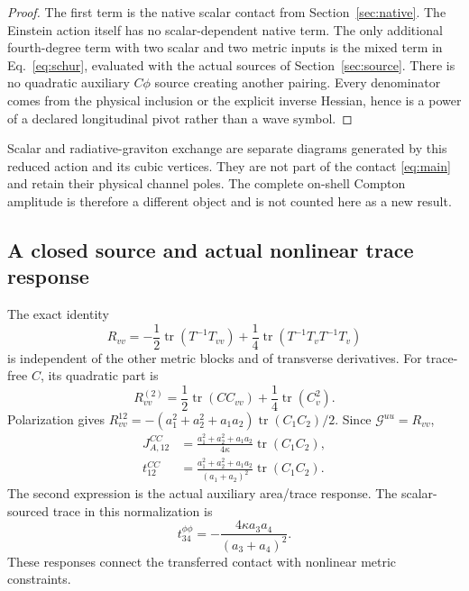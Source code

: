 \documentclass[11pt]{article}
\newcommand{\tr}{\operatorname{tr}}
\newcommand{\Gden}{\mathcal G}
\begin{document}
\begin{proof}
The first term is the native scalar contact from Section~\ref{sec:native}.
The Einstein action itself has no scalar-dependent native term.
The only additional fourth-degree term with two scalar and two metric inputs is the mixed term in Eq.~\eqref{eq:schur}, evaluated with the actual sources of Section~\ref{sec:source}.
There is no quadratic auxiliary \(C\phi\) source creating another pairing.
Every denominator comes from the physical inclusion or the explicit inverse Hessian, hence is a power of a declared longitudinal pivot rather than a wave symbol.
\end{proof}

Scalar and radiative-graviton exchange are separate diagrams generated by this reduced action and its cubic vertices.
They are not part of the contact \eqref{eq:main} and retain their physical channel poles.
The complete on-shell Compton amplitude is therefore a different object and is not counted here as a new result.

\subsection{A closed source and actual nonlinear trace response}

The exact identity
\begin{equation}
 R_{vv}=-\frac12\tr(T^{-1}T_{vv})
 +\frac14\tr(T^{-1}T_vT^{-1}T_v)
 \label{eq:Rvv}
\end{equation}
is independent of the other metric blocks and of transverse derivatives.
For trace-free \(C\), its quadratic part is
\begin{equation}
 R_{vv}^{(2)}=\frac12\tr(CC_{vv})+\frac14\tr(C_v^2).
 \label{eq:Rvv2}
\end{equation}
Polarization gives \(R^{12}_{vv}=-(a_1^2+a_2^2+a_1a_2)\tr(C_1C_2)/2\).
Since \(\Gden^{uu}=R_{vv}\),
\begin{align}
 J^{CC}_{A,12}&=\frac{a_1^2+a_2^2+a_1a_2}{4\kappa}\tr(C_1C_2),
 \label{eq:JAclosed}\\
 t^{CC}_{12}&=\frac{a_1^2+a_2^2+a_1a_2}{(a_1+a_2)^2}\tr(C_1C_2).
 \label{eq:tclosed}
\end{align}
The second expression is the actual auxiliary area/trace response.
The scalar-sourced trace in this normalization is
\begin{equation}
 t^{\phi\phi}_{34}=-\frac{4\kappa a_3a_4}{(a_3+a_4)^2}.
 \label{eq:scalar-trace}
\end{equation}
These responses connect the transferred contact with nonlinear metric constraints.
\end{document}
